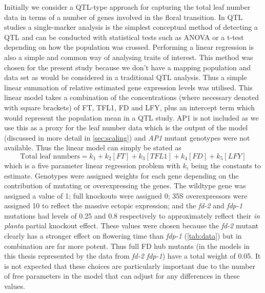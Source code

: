 Initially we consider a QTL-type approach for capturing the total leaf number data in terms of a number of genes involved in the floral transition.
In QTL studies a single-marker analysis is the simplest conceptual method of detecting a QTL and can be conducted with statistical tests such as ANOVA or a t-test depending on how the population was crossed.
Performing a linear regression is also a simple and common way of analysing traits of interest.
This method was chosen for the present study because we don't have a mapping population and data set as would be considered in a traditional QTL analysis.
Thus a simple linear summation of relative estimated gene expression levels was utilised.
This linear model takes a combination of the concentrations (where necessary denoted with square brackets) of FT, TFL1, FD and LFY, plus an intercept term which would represent the population mean in a QTL study.
AP1 is not included as we use this as a proxy for the leaf number data which is the output of the model (discussed in more detail in \autoref{sec:scaling}) and \emph{AP1} mutant genotypes were not available.
Thus the linear model can simply be stated as
\begin{equation*}
\text{Total leaf numbers} = k_1 + k_2[FT] + k_3[TFL1] + k_4[FD] + k_5[LFY]
\end{equation*}
which is a five parameter linear regression problem with $k_i$ being the constants to estimate.
Genotypes were assigned weights for each gene depending on the contribution of mutating or overexpressing the genes.
The wildtype gene was assigned a value of 1; full knockouts were assigned 0; 35S overexpressors were assigned 10 to reflect the massive ectopic expression; and the \emph{fd-2} and \emph{fdp-1} mutations had levels of 0.25 and 0.8 respectively to approximately reflect their \emph{in planta} partial knockout effect.
These values were chosen because the \emph{fd-2} mutant clearly has a stronger effect on flowering time than \emph{fdp-1} (\autoref{tab:data}) but in combination are far more potent.
Thus full FD hub mutants (in the models in this thesis represented by the data from \emph{fd-2 fdp-1}) have a total weight of 0.05.
It is not expected that these choices are particularly important due to the number of free parameters in the model that can adjust for any differences in these values.

